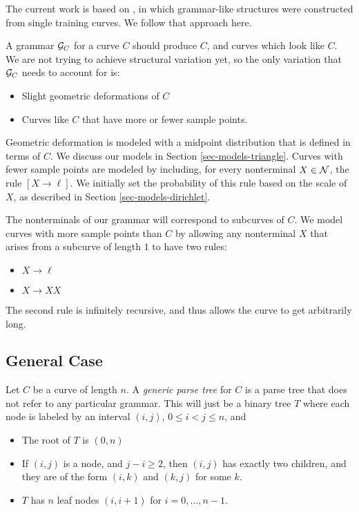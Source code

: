 

The current work is based on \cite{hcm}, in which grammar-like
structures were constructed from single training curves. We follow
that approach here.

A grammar ${\mathcal G}_C$ for a curve $C$ should produce $C$, and curves
which look like $C$. We are not trying to achieve structural variation
yet, so the only variation that ${\mathcal G}_C$ needs to account for is:
\begin{itemize}
\item Slight geometric deformations of $C$
\item Curves like $C$ that have more or fewer sample points.
\end{itemize}
Geometric deformation is modeled with a midpoint distribution that is
defined in terms of $C$. We discuss our models in Section
\ref{sec-models-triangle}. Curves with fewer sample points are modeled
by including, for every nonterminal $X\in {\mathcal N}$, the rule $[X\to
\ell]$. We initially set the probability of this rule based on the
scale of $X$, as described in Section \ref{sec-models-dirichlet}.

The nonterminals of our grammar will correspond to subcurves of $C$.
We model curves with more sample points than $C$ by allowing any
nonterminal $X$ that arises from a subcurve of length $1$ to have two
rules:
\begin{itemize}
\item $X\to \ell$
\item $X\to XX$
\end{itemize}
The second rule is infinitely recursive, and thus allows the curve to
get arbitrarily long.

\subsection{General Case}

Let $C$ be a curve of length $n$. A \emph{generic parse tree} for $C$
is a parse tree that does not refer to any particular grammar. This
will just be a binary tree $T$ where each node is labeled by an
interval $(i,j)$, $0\le i < j \le n$, and
\begin{itemize}
\item The root of $T$ is $(0,n)$
\item If $(i,j)$ is a node, and $j-i \ge 2$, then $(i,j)$ has exactly
  two children, and they are of the form $(i,k)$ and $(k,j)$ for some
  $k$.
\item $T$ has $n$ leaf nodes $(i,i+1)$ for $i=0,\dots,n-1$.
\end{itemize}

